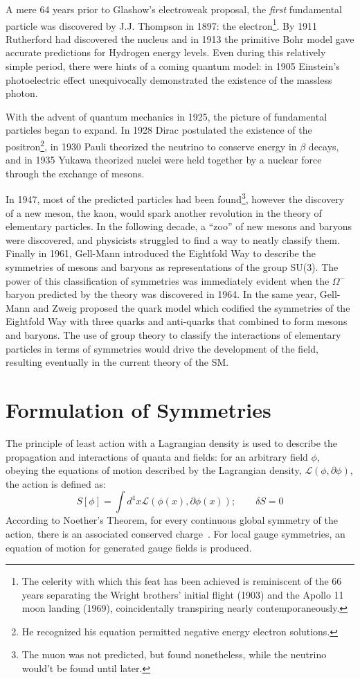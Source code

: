 A mere 64 years prior to Glashow's electroweak proposal, the {\em first} fundamental particle was discovered by J.J. Thompson in 1897: the electron\footnote{
	The celerity with which this feat has been achieved is reminiscent of the 66 years separating the Wright brothers' initial flight (1903) and the Apollo 11 moon landing (1969), coincidentally transpiring nearly contemporaneously.
}. By 1911 Rutherford had discovered the nucleus and in 1913 the primitive Bohr model gave accurate predictions for Hydrogen energy levels. Even during this relatively simple period, there were hints of a coming quantum model: in 1905 Einstein's photoelectric effect unequivocally demonstrated the existence of the massless photon. 

With the advent of quantum mechanics in 1925, the picture of fundamental particles began to expand. In 1928 Dirac postulated the existence of the positron\footnote{
	He recognized his equation permitted negative energy electron solutions.
}, in 1930 Pauli theorized the neutrino to conserve energy in $\beta$ decays, and in 1935 Yukawa theorized nuclei were held together by a nuclear force through the exchange of mesons.  

In 1947, most of the predicted particles had been found\footnote{
	The muon was not predicted, but found nonetheless, while the neutrino would't be found until later.
}, however the discovery of a new meson, the kaon, would spark another revolution in the theory of elementary particles. In the following decade, a ``zoo'' of new mesons and baryons were discovered, and physicists struggled to find a way to neatly classify them. Finally in 1961, Gell-Mann introduced the Eightfold Way to describe the symmetries of mesons and baryons as representations of the group SU(3). The power of this classification of symmetries was immediately evident when the $\Omega^-$ baryon predicted by the theory was discovered in 1964. In the same year, Gell-Mann and Zweig proposed the quark model which codified the symmetries of the Eightfold Way with three quarks and anti-quarks that combined to form mesons and baryons. The use of group theory to classify the interactions of elementary particles in terms of symmetries would drive the development of the field, resulting eventually in the current theory of the SM.

\fi

%
\section{Formulation of Symmetries}
The principle of least action with a Lagrangian density is used to describe the propagation and interactions of quanta and fields: for an arbitrary field $\phi$, obeying the equations of motion described by the Lagrangian density, $\mathcal{L}(\phi,\partial \phi)$, the action is defined as:
 $$S[\phi] = \int d^4x \mathcal{L}(\phi(x),\partial\phi(x)); \quad\quad \delta S = 0$$ 
 According to Noether's Theorem, for every continuous global symmetry of the action, there is an associated conserved charge~\cite{noether}. For local gauge symmetries, an equation of motion for generated gauge fields is produced.

